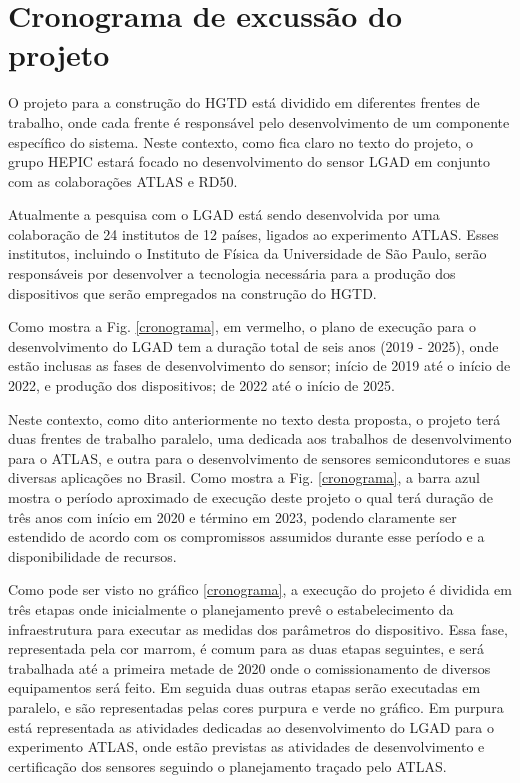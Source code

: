 \chapter{Cronograma de excussão do projeto}

O projeto para a construção do HGTD está dividido em diferentes frentes de trabalho, onde cada frente é responsável pelo desenvolvimento de um componente específico do sistema. Neste contexto, como fica claro no texto do projeto, o grupo HEPIC estará focado no desenvolvimento do sensor LGAD em conjunto com as colaborações ATLAS e RD50. 

Atualmente a pesquisa com o LGAD está sendo desenvolvida por uma colaboração de 24 institutos de 12 países, ligados ao experimento ATLAS. Esses institutos, incluindo o Instituto de Física da Universidade de São Paulo, serão responsáveis por desenvolver a tecnologia necessária para a produção dos dispositivos que serão empregados na construção do HGTD.

Como mostra a Fig. \ref{cronograma}, em vermelho, o plano de execução para o desenvolvimento do LGAD tem a duração total de seis anos (2019 - 2025), onde estão inclusas as fases de desenvolvimento do sensor; início de 2019 até o início de 2022, e produção dos dispositivos; de 2022 até o início de 2025. 

Neste contexto, como dito anteriormente no texto desta proposta, o projeto terá duas frentes de trabalho paralelo, uma dedicada aos trabalhos de desenvolvimento para o ATLAS, e outra para o desenvolvimento de sensores semicondutores e suas diversas aplicações no Brasil. Como mostra a Fig. \ref{cronograma}, a barra azul mostra o período aproximado de execução deste projeto o qual terá duração de três anos com início em 2020 e término em 2023, podendo claramente ser estendido de acordo com os compromissos assumidos durante esse período e a disponibilidade de recursos.

Como pode ser visto no gráfico \ref{cronograma}, a execução do projeto é dividida em três etapas onde inicialmente o planejamento prevê o estabelecimento da infraestrutura para executar as medidas dos parâmetros do dispositivo. Essa fase, representada pela cor marrom, é comum para as duas etapas seguintes, e será trabalhada até a primeira metade de 2020 onde o comissionamento de diversos equipamentos será feito. Em seguida duas outras etapas serão executadas em paralelo, e são representadas pelas cores purpura e verde no gráfico. Em purpura está representada as atividades dedicadas ao desenvolvimento do LGAD para o experimento ATLAS, onde estão previstas as atividades de desenvolvimento e certificação dos sensores seguindo o planejamento traçado pelo ATLAS.

